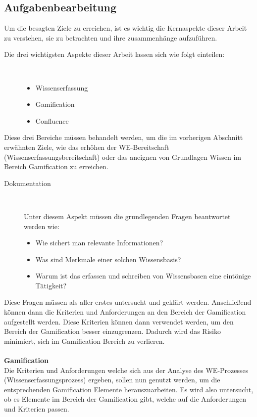 \documentclass[a4paper,12pt,twoside]{scrartcl}
\begin{document}
\subsection{Aufgabenbearbeitung} 
Um die besagten Ziele zu erreichen, ist es wichtig die Kernaspekte dieser Arbeit zu verstehen, sie zu betrachten und ihre zusammenhänge aufzuführen.
\begin{description}
   \item[Die drei wichtigsten Aspekte dieser Arbeit lassen sich wie folgt einteilen:]~\par
   \begin{itemize}
      \item Wissenserfassung
      \item Gamification
      \item Confluence
   \end{itemize}
\end{description}
Diese drei Bereiche müssen behandelt werden, um die im vorherigen Abschnitt erwähnten Ziele, wie das erhöhen der WE-Bereitschaft (Wissenserfassungsbereitschaft) oder das aneignen von Grundlagen Wissen im Bereich Gamification zu erreichen.
\begin{description}
   \item[Dokumentation]~\par
Unter diesem Aspekt müssen die grundlegenden Fragen beantwortet werden wie:
   \begin{itemize}
      \item Wie sichert man relevante Informationen?
      \item Was sind Merkmale einer solchen Wissensbasis?
      \item Warum ist das erfassen und schreiben von Wissensbasen eine eintönige Tätigkeit?
   \end{itemize}
\end{description}
Diese Fragen müssen als aller erstes untersucht und geklärt werden. Anschließend können dann die Kriterien und Anforderungen an den Bereich der Gamification aufgestellt werden. Diese Kriterien können dann verwendet werden, um den Bereich der Gamification besser einzugrenzen. Dadurch wird das Risiko minimiert, sich im Gamification Bereich zu verlieren. 
\\\\
\textbf{Gamification}\\
Die Kriterien und Anforderungen welche sich aus der Analyse des WE-Prozesses (Wissenserfassungsprozess) ergeben, sollen nun genutzt werden, um die entsprechenden Gamification Elemente herauszuarbeiten. Es wird also untersucht, ob es Elemente im Bereich der Gamification gibt, welche auf die Anforderungen und Kriterien passen.
\end{document}

